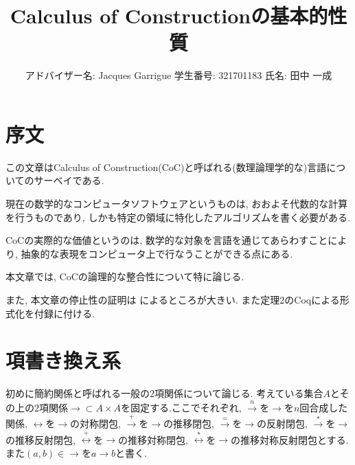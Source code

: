 \documentclass[12pt, titlepage]{ltjsarticle}
\begin{document}
\theoremstyle{definition}
\newtheorem{defn}{定義}
\newtheorem{thm}{定理}
\newtheorem{lem}{補題}
\newtheorem{rem}{注意}
\newtheorem{cor}{系}
\newtheorem{ex}{例}
\renewcommand{\proofname}{\bf{証明}}

\title{Calculus of Constructionの基本的性質}
\author{
アドバイザー名: Jacques Garrigue
学生番号: 321701183
氏名: 田中 一成
}
\maketitle

% 
% 

\section{序文}
この文章はCalculus of Construction(CoC)と呼ばれる(数理論理学的な)言語についてのサーベイである.

現在の数学的なコンピュータソフトウェアというものは, おおよそ代数的な計算を行うものであり, しかも特定の領域に特化したアルゴリズムを書く必要がある.

CoCの実際的な価値というのは, 数学的な対象を言語を通じてあらわすことにより,
抽象的な表現をコンピュータ上で行なうことができる点にある.

本文章では, CoCの論理的な整合性について特に論じる.

また, 本文章の停止性の証明は \cite{geuvers1994short}によるところが大きい.
また定理2のCoqによる形式化を付録に付ける.

\section{項書き換え系}
初めに簡約関係と呼ばれる一般の$2$項関係について論じる. 考えている集合$A$とその上の$2$項関係$\rightarrow \subset A \times A$を固定する.ここでそれぞれ,
$\xrightarrow{n}$を$\rightarrow$を$n$回合成した関係,
$\leftrightarrow$を$\rightarrow$の対称閉包,
$\xrightarrow{+}$を$\rightarrow$の推移閉包,
$\xrightarrow{=}$を$\rightarrow$の反射閉包,
$\overset{*}{\rightarrow}$を$\rightarrow$の推移反射閉包,
$\overset{+}{\leftrightarrow}$を$\rightarrow$の推移対称閉包,
$\overset{*}{\leftrightarrow}$を$\rightarrow$の推移対称反射閉包とする.
また$(a, b) \in \rightarrow$を$a \rightarrow b$と書く.
\end{document}

